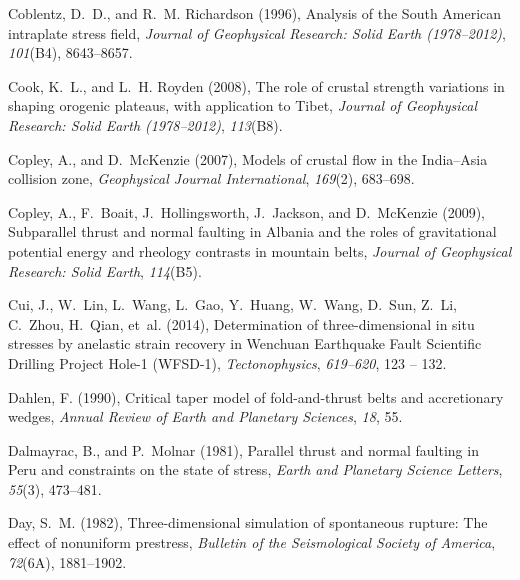 \documentclass[twocolumn,jgrga]{AGUTeX}
\begin{document}
\begin{article}
{{\begin{thebibliography}{85}
Coblentz, D.~D., and R.~M. Richardson (1996), Analysis of the {S}outh
  {A}merican intraplate stress field, \textit{Journal of Geophysical Research:
  Solid Earth (1978--2012)}, \textit{101}(B4), 8643--8657.

Cook, K.~L., and L.~H. Royden (2008), The role of crustal strength variations
  in shaping orogenic plateaus, with application to {T}ibet, \textit{Journal of
  Geophysical Research: Solid Earth (1978--2012)}, \textit{113}(B8).

Copley, A., and D.~McKenzie (2007), Models of crustal flow in the
  {I}ndia--{A}sia collision zone, \textit{Geophysical Journal International},
  \textit{169}(2), 683--698.

Copley, A., F.~Boait, J.~Hollingsworth, J.~Jackson, and D.~McKenzie (2009),
  Subparallel thrust and normal faulting in {A}lbania and the roles of
  gravitational potential energy and rheology contrasts in mountain belts,
  \textit{Journal of Geophysical Research: Solid Earth}, \textit{114}(B5).

Cui, J., W.~Lin, L.~Wang, L.~Gao, Y.~Huang, W.~Wang, D.~Sun, Z.~Li, C.~Zhou,
  H.~Qian, et~al. (2014), Determination of three-dimensional in situ stresses
  by anelastic strain recovery in {W}enchuan {E}arthquake {F}ault {S}cientific
  {D}rilling {P}roject {H}ole-1 ({W}{F}{S}{D}-1), \textit{Tectonophysics},
  \textit{619–620}, 123 -- 132.

Dahlen, F. (1990), Critical taper model of fold-and-thrust belts and
  accretionary wedges, \textit{Annual Review of Earth and Planetary Sciences},
  \textit{18}, 55.

Dalmayrac, B., and P.~Molnar (1981), Parallel thrust and normal faulting in
  {P}eru and constraints on the state of stress, \textit{Earth and Planetary
  Science Letters}, \textit{55}(3), 473--481.

Day, S.~M. (1982), Three-dimensional simulation of spontaneous rupture: {T}he
  effect of nonuniform prestress, \textit{Bulletin of the Seismological Society
  of America}, \textit{72}(6A), 1881--1902.


\end{thebibliography}}}
\end{article}
\end{document}
